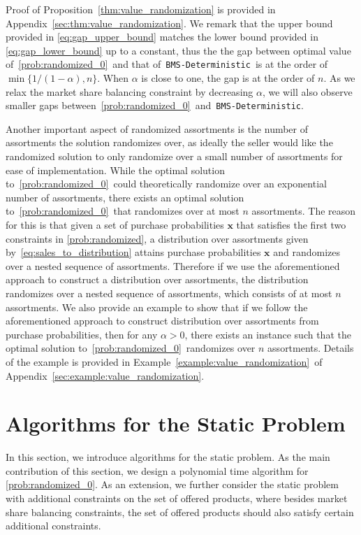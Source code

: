 \documentclass[mnsc,non-blindrev]{informs3}
\theoremstyle{definition}
\begin{document}
\vspace{0.5em}

Proof of Proposition~\ref{thm:value_randomization} is provided in Appendix~\ref{sec:thm:value_randomization}. We remark that the upper bound provided in \eqref{eq:gap_upper_bound} matches the lower bound provided in \eqref{eq:gap_lower_bound} up to a constant, thus the the gap between optimal value of~\ref{prob:randomized_0}~and that of~\texttt{BMS-Deterministic}~is at the order of $\min\{1/(1-\alpha),n\}$. When $\alpha$ is close to one, the gap is at the order of $n$. As we relax the market share balancing constraint by decreasing $\alpha$, we will also observe smaller gaps between~\ref{prob:randomized_0}~and~\texttt{BMS-Deterministic}.

Another important aspect of randomized assortments is the number of assortments the solution randomizes over, as ideally the seller would like the randomized solution to only randomize over a small number of assortments for ease of implementation. While the optimal solution to~\ref{prob:randomized_0}~could theoretically randomize over an exponential number of assortments, there exists an optimal solution to~\ref{prob:randomized_0}~that randomizes over at most $n$ assortments. The reason for this is that given a set of purchase probabilities $\bm{x}$ that satisfies the first two constraints in \ref{prob:randomized}, a distribution over assortments given by~\eqref{eq:sales_to_distribution} attains purchase probabilities $\bm{x}$ and randomizes over a nested sequence of assortments. Therefore if we use the aforementioned approach to construct a distribution over assortments, the distribution randomizes over a nested sequence of assortments, which consists of at most $n$ assortments. We also provide an example to show that if we follow the aforementioned approach to construct distribution over assortments from purchase probabilities, then for any $\alpha>0$, there exists an instance such that the optimal solution to~\ref{prob:randomized_0}~randomizes over $n$ assortments. Details of the example is provided in Example~\ref{example:value_randomization}~of Appendix~\ref{sec:example:value_randomization}.

\section{Algorithms for the Static Problem}\label{sec:randomized}

In this section, we introduce algorithms for the static problem. As the main contribution of this section, we design a polynomial time algorithm for \ref{prob:randomized_0}. As an extension, we further consider the static problem with additional constraints on the set of offered products, where besides market share balancing constraints, the set of offered products should also satisfy certain additional constraints.
\end{document}
